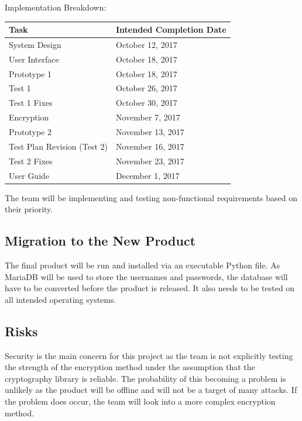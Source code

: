 \documentclass[12pt, titlepage]{article}
\begin{document}
Implementation Breakdown:

\begin{table}[H]
\centering
{}
\begin{tabular}{ | p{5cm} | p{10cm} | }
	\hline
	Task & Intended Completion Date \\
	\hline
	System Design & October 12, 2017 \\
	\hline
	User Interface & October 18, 2017 \\
	\hline
	Prototype 1 & October 18, 2017 \\
	\hline
	Test 1 & October 26, 2017 \\
	\hline
	Test 1 Fixes & October 30, 2017 \\
	\hline
	Encryption & November 7, 2017 \\
	\hline
	Prototype 2 & November 13, 2017 \\
	\hline
	Test Plan Revision (Test 2) & November 16, 2017 \\
	\hline
	Test 2 Fixes & November 23, 2017 \\
	\hline
	User Guide & December 1, 2017 \\
\hline
\end{tabular}
\end{table}

The team will be implementing and testing non-functional requirements based on their priority.

\subsection{Migration to the New Product}

The final product will be run and installed via an executable Python file. As MariaDB will be used to store the usernames and passwords, the database will have to be converted before the product is released. It also needs to be tested on all intended operating systems.

\subsection{Risks}

Security is the main concern for this project as the team is not explicitly testing the strength of the encryption method under the assumption that the cryptography library is reliable. The probability of this becoming a problem is unlikely as the product will be offline and will not be a target of many attacks. If the problem does occur, the team will look into a more complex encryption method. 
\end{document}
